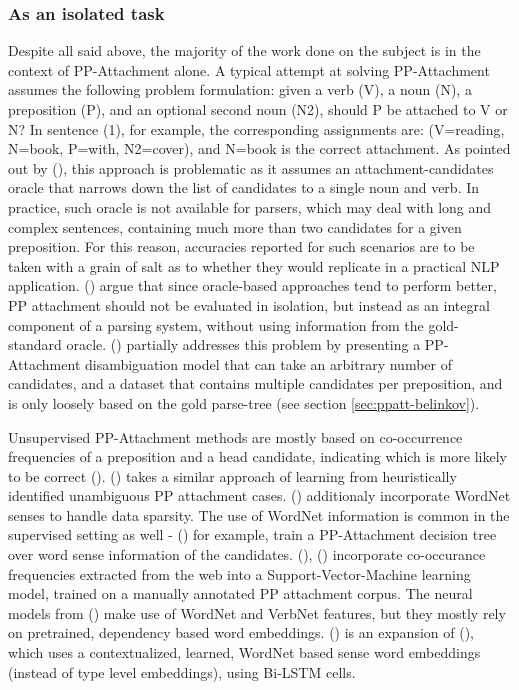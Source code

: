 \subsubsection{As an isolated task} \label{sec:ppatt_isolated}

Despite all said above, the majority of the work done on the subject is in the context of PP-Attachment alone. A typical attempt at solving PP-Attachment assumes the following problem formulation: given a verb (V), a noun (N), a preposition (P), and an optional second noun (N2), should P be attached to V or N? In sentence (1), for example, the corresponding assignments are: (V=reading, N=book, P=with, N2=cover), and N=book is the correct attachment.  As pointed out by (\cite{doi:10.1162/coli.07.33.4.469}), this approach is problematic as it assumes an attachment-candidates oracle that narrows down the list of candidates to a single noun and verb. In practice, such oracle is not available for parsers, which may deal with long and complex sentences, containing much more than two candidates for a given preposition. For this reason, accuracies reported for such scenarios are to be taken with a grain of salt as to whether they would replicate in a practical NLP application. (\cite{doi:10.1162/coli.07.33.4.469}) argue that since oracle-based approaches tend to perform better, PP attachment should not be evaluated in isolation, but instead as an integral component of a parsing system, without using information from the gold-standard oracle. (\cite{hpcd}) partially addresses this problem by presenting a PP-Attachment disambiguation model that can take an arbitrary number of candidates, and a dataset that contains multiple candidates per preposition, and is only loosely based on the gold parse-tree (see section \ref{sec:ppatt-belinkov}).    

Unsupervised PP-Attachment methods are mostly based on co-occurrence frequencies of a preposition and a head candidate, indicating which is more likely to be correct (\cite{hindle-rooth-93-structural}).  (\cite{ratnaparkhi-98-statistical}) takes a similar approach of learning from heuristically identified unambiguous PP attachment cases.  (\cite{medimi-07})  additionaly incorporate WordNet senses to handle data sparsity. The use of WordNet  information is common in the supervised setting as well - (\cite{stetina-nagao-97-corpus}) for example, train a PP-Attachment decision tree over word sense information of the candidates. (\cite{10.1007/11562214_17}), (\cite{olteanu-05}) incorporate co-occurance frequencies extracted from the web into a Support-Vector-Machine learning model, trained on a manually annotated PP attachment corpus. The neural models from (\cite{hpcd}) make use of WordNet and VerbNet features, but they mostly rely on pretrained, dependency based word embeddings. (\cite{dasigi-etal-17-ontology}) is an expansion of (\cite{hpcd}), which uses a contextualized, learned, WordNet based sense word embeddings (instead of type level embeddings), using Bi-LSTM cells.


